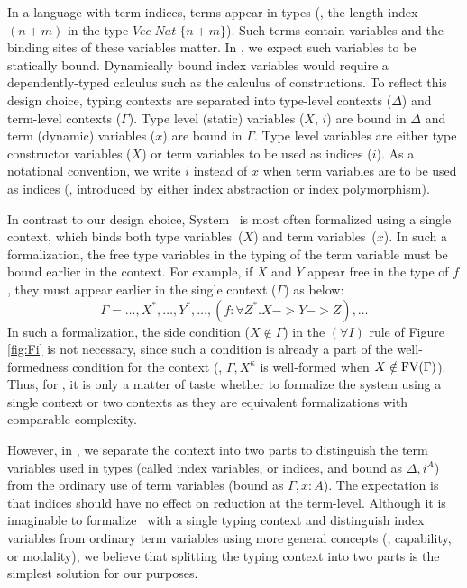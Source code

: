 In a language with term indices, terms appear in types (\eg, the length index
$(n+m)$ in the type $\textit{Vec}\;\textit{Nat}\;\{n+m\}$).
Such terms contain variables and the binding sites of these variables matter.
In \Fi, we expect such variables to be statically bound. Dynamically bound
index variables would require a dependently-typed calculus such as
the calculus of constructions. To reflect this design choice,
typing contexts are separated into type-level contexts ($\Delta$) and
term-level contexts ($\Gamma$). Type level (static) variables ($X$, $i$) are
bound in $\Delta$ and term (dynamic) variables ($x$) are bound in $\Gamma$.
Type level variables are either type constructor variables ($X$) or
term variables to be used as indices ($i$). As a notational convention,
we write $i$ instead of $x$ when term variables are to be used as indices
(\ie, introduced by either index abstraction or index polymorphism).

In contrast to our design choice, System \Fw\ is most often formalized using
a single context, which binds both type variables~($X$) and term 
variables~($x$). 
In such a formalization, the free type variables in the typing of
the term variable must be bound earlier in the context. For example,
if $X$ and $Y$ appear free in the type of $f$, they must appear earlier
in the single context ($\Gamma$) as below:
\[ \Gamma = \dots,X^{\mathtt*},\dots,Y^{\mathtt*},\dots,
		(f:\forall Z^{\mathtt*}.X -> Y -> Z),\dots \]
In such a formalization, the side condition ($X\notin\Gamma$)
in the $(\forall I)$ rule of Figure \ref{fig:Fi} is not necessary,
since such a condition is already a part of the well-formedness condition
for the context (\ie, $\Gamma,X^\kappa$ is well-formed when
$X\notin\mathop{\mathrm{FV}}(\Gamma)$). Thus, for \Fw, it is only a matter of taste
whether to formalize the system using a single context or two contexts
as they are equivalent formalizations with comparable complexity.

However, in \Fi, we separate the context into two parts to distinguish
the term variables used in types (called index variables, or indices,
and bound as $\Delta,i^A$) from the ordinary use of term variables
(bound as $\Gamma,x : A$). The expectation is that indices
should have no effect on reduction at the term-level.
Although it is imaginable to formalize \Fi\ with a single typing context
and distinguish index variables from ordinary term variables using
more general concepts (\eg, capability, or modality), we believe that splitting
the typing context into two parts is the simplest solution for our purposes.

